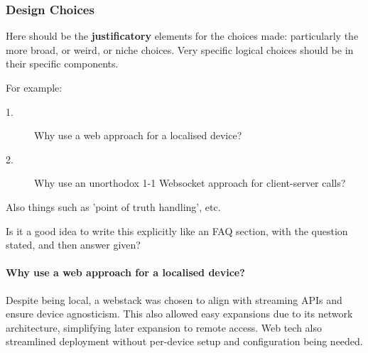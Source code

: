             \subsubsection{Design Choices}
                \begin{temp}
                    Here should be the \textbf{justificatory} elements for the choices made: particularly the more broad, or weird, or niche choices. Very specific logical choices should be in their specific components.
                
                    For example:
                    \begin{description}
                        \item[1.] Why use a web approach for a localised device?
                        \item[2.] Why use an unorthodox 1-1 Websocket approach for client-server calls?
                    \end{description}
                    Also things such as 'point of truth handling', etc.
    
                    Is it a good idea to write this explicitly like an FAQ section, with the question stated, and then answer given?
                \end{temp}
    
                \paragraph{Why use a web approach for a localised device?} Despite being local, a webstack was chosen to align with streaming APIs and ensure device agnosticism. This also allowed easy expansions due to its network architecture, simplifying later expansion to remote access. Web tech also streamlined deployment without per-device setup and configuration being needed.
    
